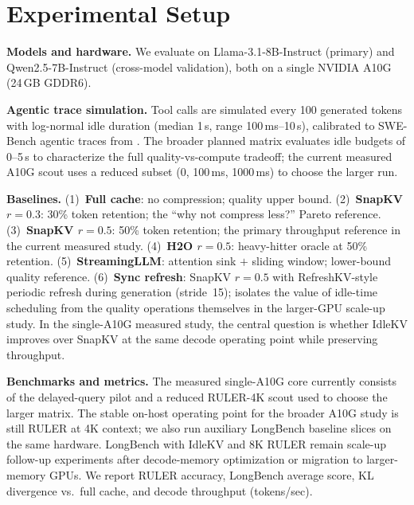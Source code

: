 \documentclass[10pt,twocolumn,letterpaper]{article}
\begin{document}
\section{Experimental Setup}
\label{sec:setup}

\textbf{Models and hardware.}
We evaluate on Llama-3.1-8B-Instruct (primary) and Qwen2.5-7B-Instruct
(cross-model validation), both on a single NVIDIA A10G (24\,GB GDDR6).

\textbf{Agentic trace simulation.}
Tool calls are simulated every 100 generated tokens with log-normal idle
duration (median 1\,s, range 100\,ms--10\,s), calibrated to SWE-Bench agentic
traces from \citet{continuum2025}. The broader planned matrix evaluates idle
budgets of 0--5\,s to characterize the full quality-vs-compute tradeoff; the
current measured A10G scout uses a reduced subset (0, 100\,ms, 1000\,ms) to
choose the larger run.

\textbf{Baselines.}
(1)~\textbf{Full cache}: no compression; quality upper bound.
(2)~\textbf{SnapKV $r{=}0.3$}: 30\% token retention; the ``why not compress
less?'' Pareto reference.
(3)~\textbf{SnapKV $r{=}0.5$}: 50\% token retention; the primary throughput
reference in the current measured study.
(4)~\textbf{H2O $r{=}0.5$}: heavy-hitter oracle at 50\% retention.
(5)~\textbf{StreamingLLM}: attention sink $+$ sliding window; lower-bound
quality reference.
(6)~\textbf{Sync refresh}: SnapKV $r{=}0.5$ with RefreshKV-style periodic
refresh during generation (stride~15); isolates the value of idle-time
scheduling from the quality operations themselves in the larger-GPU scale-up
study. In the single-A10G measured study, the central question is whether
IdleKV improves over SnapKV at the same decode operating point while preserving
throughput.

\textbf{Benchmarks and metrics.}
The measured single-A10G core currently consists of the delayed-query pilot and
a reduced RULER-4K scout used to choose the larger matrix. The stable on-host
operating point for the broader A10G study is still RULER at 4K context; we
also run auxiliary LongBench baseline slices on the same hardware. LongBench
with IdleKV and 8K RULER remain scale-up follow-up experiments after
decode-memory optimization or migration to larger-memory GPUs. We report RULER
accuracy, LongBench average score, KL divergence vs.\ full cache, and decode
throughput (tokens/sec).

%
\end{document}
